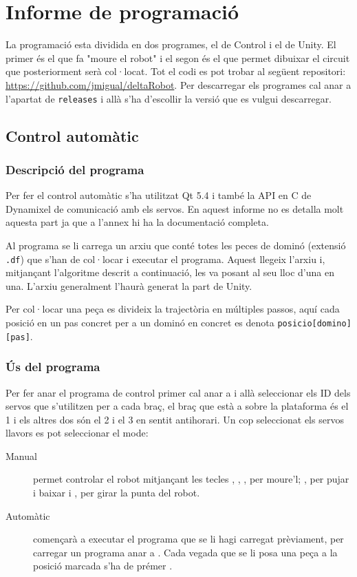\section{Informe de programació}

La programació esta dividida en dos programes, el de Control i el de Unity. El primer és el que fa "moure el robot" i el segon és el que permet dibuixar el circuit que posteriorment serà col·locat.
Tot el codi es pot trobar al següent repositori: \href{https://github.com/jmigual/deltaRobot}{https://github.com/jmigual/deltaRobot}.
Per descarregar els programes cal anar a l'apartat de \verb|releases| i allà s'ha d'escollir la versió que es vulgui descarregar.

\subsection{Control automàtic}
\subsubsection{Descripció del programa}

Per fer el control automàtic s'ha utilitzat Qt 5.4 i també la API en C de Dynamixel de comunicació amb els servos. En aquest informe no es detalla molt aquesta part ja que a l'annex hi ha la documentació completa.

Al programa se li carrega un arxiu que conté totes les peces de dominó (extensió \verb|.df|) que s'han de col·locar i executar el programa. Aquest llegeix l'arxiu i, mitjançant l'algoritme descrit a continuació, les va posant al seu lloc d'una en una. L'arxiu generalment l'haurà generat la part de Unity.

Per col·locar una peça es divideix la trajectòria en múltiples passos, aquí cada posició en un pas concret per a un dominó en concret es denota \verb|posicio[domino][pas]|.

\subsubsection{Ús del programa}

Per fer anar el programa de control primer cal anar a  i allà seleccionar els ID dels servos que s'utilitzen per a cada braç, el braç que està a sobre la plataforma és el 1 i els altres dos són el 2 i el 3 en sentit antihorari.
Un cop seleccionat els servos llavors es pot seleccionar el mode:
\begin{description}
\item[Manual] permet controlar el robot mitjançant les tecles , , ,  per moure'l; ,  per pujar i baixar i ,  per girar la punta del robot.
\item[Automàtic] començarà a executar el programa que se li hagi carregat prèviament, per carregar un programa anar a . Cada vegada que se li posa una peça a la posició marcada s'ha de prémer \keys{\return}.
\end{description}


